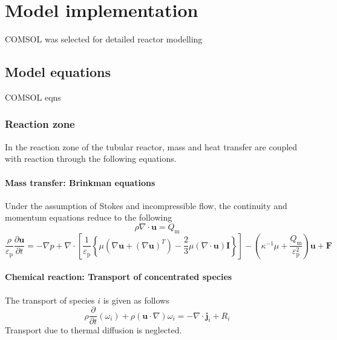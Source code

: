 \section{Model implementation}

COMSOL was selected for detailed reactor modelling

\subsection{Model equations}
COMSOL eqns

\subsubsection{Reaction zone}

In the reaction zone of the tubular reactor, mass and heat transfer are coupled with reaction through the following equations.

\paragraph{Mass transfer: Brinkman equations}

Under the assumption of Stokes and incompressible flow, the continuity and momentum equations reduce to the following \cite{comsol_cfd_2020}
\begin{equation}
    \rho\nabla \cdot \mathbf{u}=Q_{\mathrm{m}}
\end{equation}
\begin{equation}
    \frac{\rho}{\varepsilon_{\mathrm{p}}} \frac{\partial \mathbf{u}}{\partial t} =
    -\nabla p+\nabla \cdot\left[\frac{1}{\varepsilon_{\mathrm{p}}}\left\{\mu\left(\nabla \mathbf{u}+(\nabla \mathbf{u})^{T}\right)-\frac{2}{3} \mu(\nabla \cdot \mathbf{u}) \mathbf{I}\right\}\right]-\left(\kappa^{-1} \mu+\frac{Q_{\mathrm{m}}}{\varepsilon_{\mathrm{p}}^{2}}\right) \mathbf{u}+\mathbf{F}
\end{equation}

\paragraph{Chemical reaction: Transport of concentrated species}
The transport of species $i$ is given as follows \cite{comsol_cfd_2020}
\begin{equation}
    \rho \frac{\partial}{\partial t}\left(\omega_{i}\right)+\rho(\mathbf{u} \cdot \nabla) \omega_{i}=-\nabla \cdot \mathbf{j}_{i}+R_{i}
\end{equation}
Transport due to thermal diffusion is neglected.

